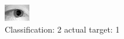 \begin{figure}[h!]
\begin{center}
\includegraphics[width=0.60\columnwidth]{figures/ID1426_class_2_target_1.png}
\end{center}
\caption{ Classification: 2 actual target: 1}
\label{fig:ID1426_class_2_target_1}
\end{figure}
